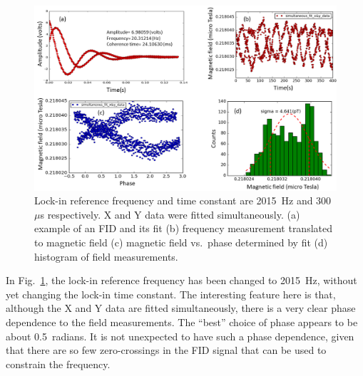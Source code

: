 \begin{figure}%
\centering\includegraphics[width=\linewidth]{figures/freq_2015_simultaneous_fit_300microsec.png}
\caption{Lock-in reference frequency and time constant are 2015~Hz and
  300~$\mu$s respectively.  X and Y data were fitted simultaneously.
  (a) example of an FID and its fit (b) frequency measurement
  translated to magnetic field (c) magnetic field vs.~phase determined
  by fit (d) histogram of field
  measurements.\label{fig:freq_2015_simultaneous_fit_300_micros}}
\end{figure}

In Fig.~\ref{fig:freq_2015_simultaneous_fit_300_micros}, the lock-in
reference frequency has been changed to 2015~Hz, without yet changing
the lock-in time constant.  The interesting feature here is that,
although the X and Y data are fitted simultaneously, there is a very
clear phase dependence to the field measurements.  The ``best'' choice
of phase appears to be about 0.5~radians.  It is not unexpected to
have such a phase dependence, given that there are so few
zero-crossings in the FID signal that can be used to constrain the
frequency.


